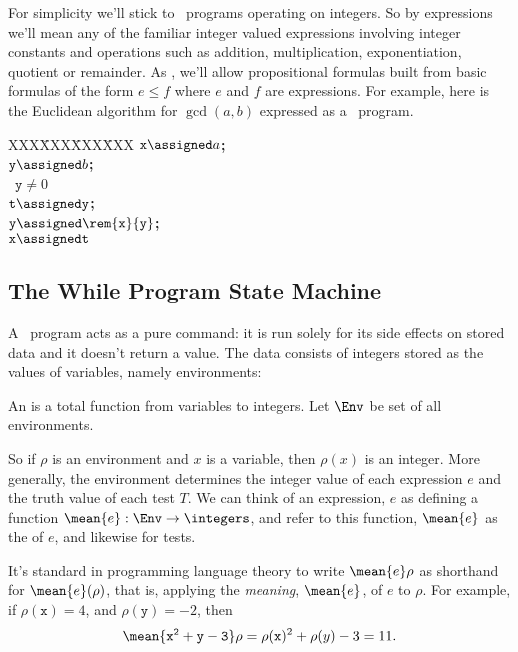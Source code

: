 For simplicity we'll stick to \while\ programs operating on integers.  So by
expressions we'll mean any of the familiar integer valued
expressions involving integer constants and operations such as addition,
multiplication, exponentiation, quotient or remainder.  As ,
we'll allow propositional formulas built from basic formulas of the form
$e \leq f$ where $e$ and $f$ are expressions.  For example, here is the
Euclidean algorithm for $\gcd(a,b)$ expressed as a \while\ program.
\begin{tabbing}
XXX\=XXX\=XXX\=XXX\kill
$\mathtt{x} \assigned a$\textbf{;} \\
$\mathtt{y} \assigned b$\textbf{;} \\
\while\ $\mathtt{y} \neq 0$ \docomm\\
   \> $\mathtt{t} \assigned \mathtt{y}$\textbf{;}\\
   \> $\mathtt{y} \assigned \rem{\mathtt{x}}{\mathtt{y}}$\textbf{;}\\
   \> $\mathtt{x} \assigned \mathtt{t}$
\odcomm\\
\end{tabbing}

\subsection{The \textbf{While}  Program State Machine}

A \while\ program acts as a pure command: it is run solely for its
side effects on stored data and it doesn't return a value.  The data
consists of integers stored as the values of variables, namely
environments:
\begin{definition}
An  is a total function from variables to integers.
Let $\Env$ be set of all environments.
\end{definition}
So if $\rho$ is an environment and $x$ is a variable, then $\rho(x)$ is an
integer.  More generally, the environment determines the integer value of
each expression $e$ and the truth value of each test $T$.  We can think
of an expression, $e$ as defining a function $\mean{e}:\Env \to
\integers$, and refer to this function, $\mean{e}$ as the 
of $e$, and likewise for tests.

It's standard in programming language theory to write $\mean{e}\rho$
as shorthand for $\mean{e}(\rho)$, that is, applying
the \emph{meaning}, $\mean{e}$, of $e$ to $\rho$.  For example, if
$\rho(\mathtt{x}) =4$, and $\rho(\mathtt{y}) =-2$, then
\begin{equation}\label{x2y311}
\mean{\mathtt{x^2+y -3}}\rho = \rho(\mathtt{x})^2 + \rho(y) -3 = 11.
\end{equation}

